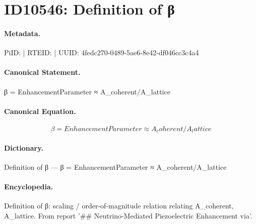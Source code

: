 \section*{ID10546: Definition of β}
\paragraph{Metadata.}
PiID:  | RTEID:  | UUID: 4fedc270-0489-5ae6-8e42-df046cc3c4a4

\paragraph{Canonical Statement.}
β = EnhancementParameter ≈ A\_coherent/A\_lattice

\paragraph{Canonical Equation.}
\[
β = EnhancementParameter ≈ A_coherent/A_lattice
\]

\paragraph{Dictionary.}
Definition of β — β = EnhancementParameter ≈ A\_coherent/A\_lattice

\paragraph{Encyclopedia.}
Definition of β: scaling / order-of-magnitude relation relating A\_coherent, A\_lattice. From report '\#\# Neutrino-Mediated Piezoelectric Enhancement via'.
